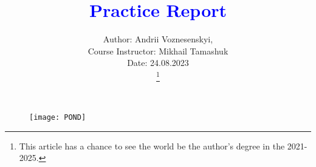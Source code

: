 \documentclass[journal]{IEEEtran}
\begin{document}
\title{\textcolor{blue}{Practice Report}}      

\author{Author: Andrii Voznesenskyi,\\
		Course Instructor: Mikhail Tamashuk\\

        Date: 24.08.2023\\

\thanks{This article has a chance to see the world be the author's degree in the 2021-2025.}} 



\maketitle

\begin{figure}[h!] \centering
\texttt{[image: POND]}
\end{figure}  






\ifCLASSOPTIONcaptionsoff
  \newpage
\fi


\end{document}
